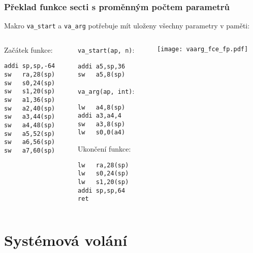 \documentclass{beamer}
\begin{document}
\begin{frame}[fragile,shrink=5]
\frametitle{Překlad funkce secti s proměnným počtem parametrů}

Makro \texttt{va\_start} a \texttt{va\_arg} potřebuje mít uloženy všechny parametry v paměti:

\begin{columns}
\begin{column}{0.25\textwidth}
Začátek funkce:

\begin{verbatim}
addi sp,sp,-64
sw   ra,28(sp)
sw   s0,24(sp)
sw   s1,20(sp)
sw   a1,36(sp)
sw   a2,40(sp)
sw   a3,44(sp)
sw   a4,48(sp)
sw   a5,52(sp)
sw   a6,56(sp)
sw   a7,60(sp)
\end{verbatim}
\end{column}   
\begin{column}{0.4\textwidth}
\texttt{va\_start(ap, n)}:

\begin{verbatim}
addi a5,sp,36
sw   a5,8(sp)
\end{verbatim}
\texttt{va\_arg(ap, int)}:
\begin{verbatim}
lw   a4,8(sp)
addi a3,a4,4
sw   a3,8(sp)
lw   s0,0(a4)
\end{verbatim}

Ukončení funkce:

\begin{verbatim}
lw   ra,28(sp)
lw   s0,24(sp)
lw   s1,20(sp)
addi sp,sp,64
ret
\end{verbatim}
\end{column}
\begin{column}{0.3\textwidth}  
\texttt{[image: vaarg\_fce\_fp.pdf]}
\end{column}
\end{columns}
\end{frame}


\section {Systémová volání}
\end{document}
